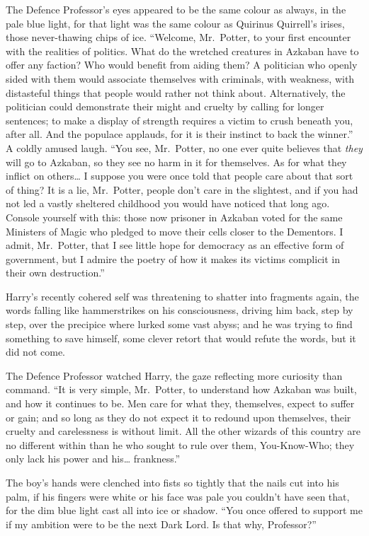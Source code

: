 The Defence Professor's eyes appeared to be the same colour as always,
in the pale blue light, for that light was the same colour as Quirinus
Quirrell's irises, those never-thawing chips of ice. ``Welcome,
Mr.~Potter, to your first encounter with the realities of politics. What
do the wretched creatures in Azkaban have to offer any faction? Who
would benefit from aiding them? A politician who openly sided with them
would associate themselves with criminals, with weakness, with
distasteful things that people would rather not think about.
Alternatively, the politician could demonstrate their might and cruelty
by calling for longer sentences; to make a display of strength requires
a victim to crush beneath you, after all. And the populace applauds, for
it is their instinct to back the winner.'' A coldly amused laugh. ``You
see, Mr.~Potter, no one ever quite believes that \emph{they} will go to
Azkaban, so they see no harm in it for themselves. As for what they
inflict on others\ldots{} I suppose you were once told that people care
about that sort of thing? It is a lie, Mr.~Potter, people don't care in
the slightest, and if you had not led a vastly sheltered childhood you
would have noticed that long ago. Console yourself with this: those now
prisoner in Azkaban voted for the same Ministers of Magic who pledged to
move their cells closer to the Dementors. I admit, Mr.~Potter, that I
see little hope for democracy as an effective form of government, but I
admire the poetry of how it makes its victims complicit in their own
destruction.''

Harry's recently cohered self was threatening to shatter into fragments
again, the words falling like hammerstrikes on his consciousness,
driving him back, step by step, over the precipice where lurked some
vast abyss; and he was trying to find something to save himself, some
clever retort that would refute the words, but it did not come.

The Defence Professor watched Harry, the gaze reflecting more curiosity
than command. ``It is very simple, Mr.~Potter, to understand how Azkaban
was built, and how it continues to be. Men care for what they,
themselves, expect to suffer or gain; and so long as they do not expect
it to redound upon themselves, their cruelty and carelessness is without
limit. All the other wizards of this country are no different within
than he who sought to rule over them, You-Know-Who; they only lack his
power and his\ldots{} frankness.''

The boy's hands were clenched into fists so tightly that the nails cut
into his palm, if his fingers were white or his face was pale you
couldn't have seen that, for the dim blue light cast all into ice or
shadow. ``You once offered to support me if my ambition were to be the
next Dark Lord. Is that why, Professor?''

